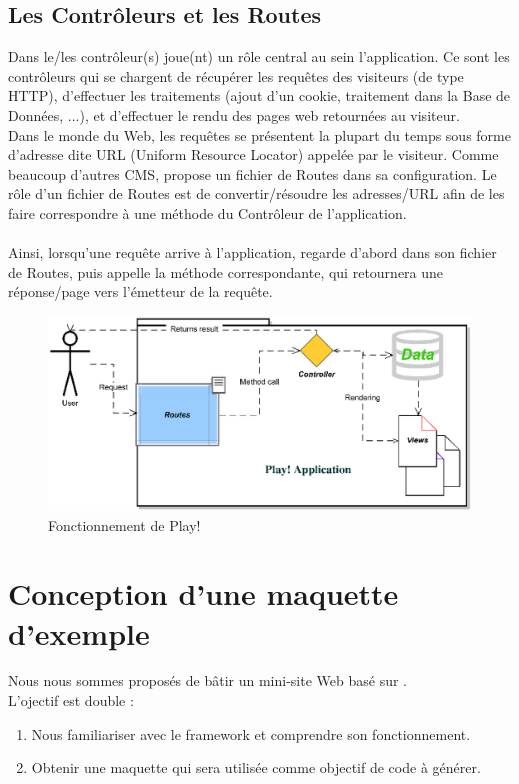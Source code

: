 \subsection{Les Contrôleurs et les Routes}
Dans \kwplay{} le/les contrôleur(s) joue(nt) un rôle central au sein l'application. Ce sont les contrôleurs qui se chargent de récupérer les requêtes des visiteurs (de type HTTP), d'effectuer les traitements (ajout d'un cookie, traitement dans la Base de Données, ...), et d'effectuer le rendu des pages web retournées au visiteur.\\
Dans le monde du Web, les requêtes se présentent la plupart du temps sous forme d'adresse dite URL (Uniform Resource Locator) appelée par le visiteur. Comme beaucoup d'autres CMS, \kwplay{} propose un fichier de Routes dans sa configuration. Le rôle d'un fichier de Routes est de convertir/résoudre les adresses/URL afin de les faire correspondre à une méthode du Contrôleur de l'application.\\\\
Ainsi, lorsqu'une requête arrive à l'application, \kwplay{} regarde d'abord dans son fichier de Routes, puis appelle la méthode correspondante, qui retournera une réponse/page vers l'émetteur de la requête.

\begin{figure}[htb]
  \centering
  \includegraphics[scale=.8]{img/play_scheme.eps}
  \caption{Fonctionnement de Play!}
  \label{fig:play_sch}
\end{figure}

\section{Conception d’une maquette d’exemple}\label{sec:pro}

Nous nous sommes proposés de bâtir un mini-site Web basé sur \kwplay{}.
\\
L'ojectif est double :
\begin{enumerate}
\item Nous familiariser avec le framework \kwplay{} et comprendre son fonctionnement.
\item Obtenir une maquette qui sera utilisée comme objectif de code à générer.
\end{enumerate}

